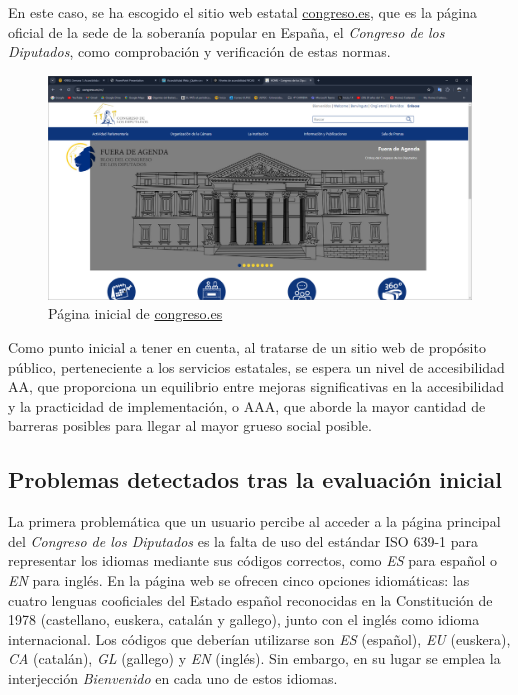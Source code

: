 \documentclass[]{article}
\begin{document}
En este caso, se ha escogido el sitio web estatal \href{https://www.congreso.es/es/home}{congreso.es}, que es la página oficial de la sede de la soberanía popular en España, el \textit{Congreso de los Diputados}, como comprobación y verificación de estas normas.

\begin{figure}[h]
	\centering
	\includegraphics[width=\textwidth]{Capturas/2.png}
	\caption{Página inicial de \href{https://www.congreso.es/es/home}{congreso.es}}
	\label{fig:etiqueta}
\end{figure}

Como punto inicial a tener en cuenta, al tratarse de un sitio web de propósito público, perteneciente a los servicios estatales, se espera un nivel de accesibilidad AA, que proporciona un equilibrio entre mejoras significativas en la accesibilidad y la practicidad de implementación, o AAA, que aborde la mayor cantidad de barreras posibles para llegar al mayor grueso social posible.

\subsection{Problemas detectados tras la evaluación inicial}

La primera problemática que un usuario percibe al acceder a la página principal del \textit{Congreso de los Diputados} es la falta de uso del estándar ISO 639-1 para representar los idiomas mediante sus códigos correctos, como \textit{ES} para español o \textit{EN} para inglés. En la página web se ofrecen cinco opciones idiomáticas: las cuatro lenguas cooficiales del Estado español reconocidas en la Constitución de 1978 (castellano, euskera, catalán y gallego), junto con el inglés como idioma internacional. Los códigos que deberían utilizarse son \textit{ES} (español), \textit{EU} (euskera), \textit{CA} (catalán), \textit{GL} (gallego) y \textit{EN} (inglés). Sin embargo, en su lugar se emplea la interjección \textit{Bienvenido} en cada uno de estos idiomas.
\end{document}
